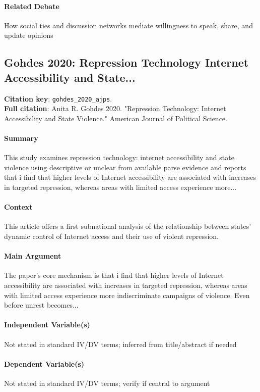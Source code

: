 \documentclass[12pt]{article}
\begin{document}
\paragraph{Related Debate} How social ties and discussion networks mediate willingness to speak, share, and update opinions


\subsection{Gohdes 2020: Repression Technology Internet Accessibility and State...}
\textbf{Citation key}: \texttt{gohdes\_2020\_ajps}.\\
\textbf{Full citation}: Anita R. Gohdes 2020. "Repression Technology: Internet Accessibility and State Violence." American Journal of Political Science.

\paragraph{Summary} This study examines repression technology: internet accessibility and state violence using descriptive or unclear from available parse evidence and reports that i find that higher levels of Internet accessibility are associated with increases in targeted repression, whereas areas with limited access experience more...

\paragraph{Context} This article offers a first subnational analysis of the relationship between states' dynamic control of Internet access and their use of violent repression.

\paragraph{Main Argument} The paper's core mechanism is that i find that higher levels of Internet accessibility are associated with increases in targeted repression, whereas areas with limited access experience more indiscriminate campaigns of violence. Even before unrest becomes...

\paragraph{Independent Variable(s)} Not stated in standard IV/DV terms; inferred from title/abstract if needed

\paragraph{Dependent Variable(s)} Not stated in standard IV/DV terms; verify if central to argument
\end{document}
